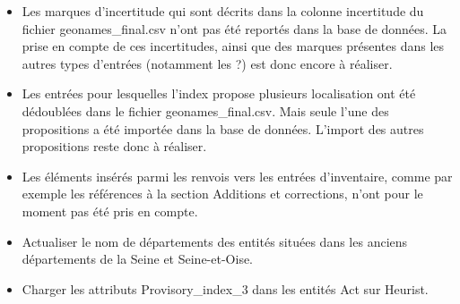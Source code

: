 \documentclass[a4paper,12pt,twoside]{book}
\begin{document}
\begin{itemize}
		\item Les marques d'incertitude qui sont décrits dans la colonne \og incertitude\fg{} du fichier geonames\_final.csv n'ont pas été reportés dans la base de données. La prise en compte de ces incertitudes, ainsi que des marques présentes dans les autres types d'entrées (notamment les \og ?\fg{}) est donc encore à réaliser.
		
		\item Les entrées pour lesquelles l'index propose plusieurs localisation ont été dédoublées dans le fichier geonames\_final.csv. Mais seule l'une des propositions a été importée dans la base de données. L'import des autres propositions reste donc à réaliser.
		
		\item Les éléments insérés parmi les renvois vers les entrées d'inventaire, comme par exemple les références à la section \og Additions et corrections\fg{}, n'ont pour le moment pas été pris en compte.
		
		\item Actualiser le nom de départements des entités situées dans les anciens départements de la Seine et Seine-et-Oise.
		
		\item Charger les attributs \og Provisory\_index\_3\fg{} dans les entités Act sur Heurist.
		
	\end{itemize}
	
	\backmatter
	\listoffigures
	\tableofcontents
	
\end{document}
